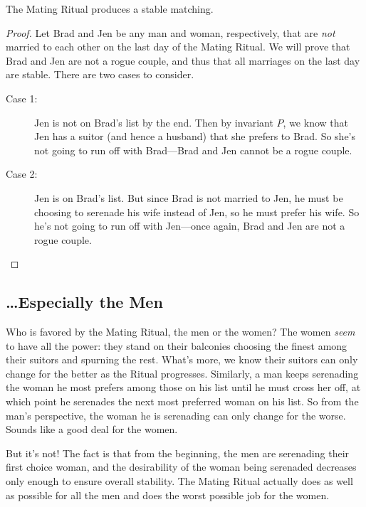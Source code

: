 \begin{theorem}
The Mating Ritual produces a stable matching.
\end{theorem}

\begin{proof}
Let Brad and Jen be any man and woman, respectively, that are
\emph{not} married to each other on the last day of the Mating Ritual.
We will prove that Brad and Jen are not a rogue couple, and thus that
all marriages on the last day are stable.  There are two cases to consider.
\begin{description}

\item[Case 1:] Jen is not on Brad's list by the end.  Then by invariant
  $P$, we know that Jen has a suitor (and hence a husband) that she
  prefers to Brad.  So she's not going to run off with Brad---Brad and
  Jen cannot be a rogue couple.

\item[Case 2:] Jen is on Brad's list.  But since Brad is not married to
  Jen, he must be choosing to serenade his wife instead of Jen, so he
  must prefer his wife.  So he's not going to run off with Jen---once
  again, Brad and Jen are not a rogue couple.
 \qedhere

\end{description}

\end{proof}


\subsection{\dots Especially the Men}

Who is favored by the Mating Ritual, the men or the women?  The women
\emph{seem} to have all the power: they stand on their balconies
choosing the finest among their suitors and spurning the rest.  What's
more, we know their suitors can only change for the better as the
Ritual progresses.  Similarly, a man keeps serenading the woman he
most prefers among those on his list until he must cross her off, at
which point he serenades the next most preferred woman on his list.  So
from the man's perspective, the woman he is serenading can only change
for the worse.  Sounds like a good deal for the women.

But it's not!  The fact is that from the beginning, the men are
serenading their first choice woman, and the desirability of the woman
being serenaded decreases only enough to ensure overall stability.
The Mating Ritual actually does as well as possible for all the men
and does the worst possible job for the women.


